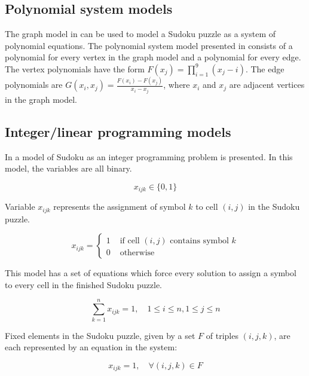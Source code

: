 \subsection{Polynomial system models}
\label{sec:models:polynomials}

The graph model in \cite{gagovargaset} can be used to model a Sudoku puzzle as a system of polynomial equations. The polynomial system model presented in \cite{gagovargaset} consists of a polynomial for every vertex in the graph model and a polynomial for every edge. The vertex polynomials have the form $F(x_j) = \prod_{i=1}^{9} (x_j - i)$. The edge polynomials are $G(x_i, x_j) = \frac{F(x_i) - F(x_j)}{x_i - x_j}$, where $x_i$ and $x_j$ are adjacent vertices in the graph model. 

\subsection{Integer/linear programming models}
\label{sec:models:lp}

In \cite{Bartlett2008} a model of Sudoku as an integer programming problem is presented. In this model, the variables are all binary.

\begin{equation}
  x_{ijk} \in \{0, 1\}
\end{equation}

Variable $x_{ijk}$ represents the assignment of symbol $k$ to cell $(i,j)$ in the Sudoku puzzle.

\begin{equation}
 x_{ijk} = 
  \left\lbrace 
   \begin{array}{rl}
    1 & \mbox{ if cell $(i, j)$ contains symbol $k$} \\
    0 & \mbox{ otherwise}
   \end{array}
  \right.
\end{equation}

This model has a set of equations which force every solution to assign a symbol to every cell in the finished Sudoku puzzle.

\begin{equation}
 \sum_{k = 1}^{n} x_{ijk} = 1, \quad 1 \leq i \leq n, 1 \leq j \leq n
\end{equation}

Fixed elements in the Sudoku puzzle, given by a set $F$ of triples $(i,j,k)$, are each represented by an equation in the system:

\begin{equation}
  x_{ijk} = 1, \quad \forall (i,j,k) \in F
\end{equation}

